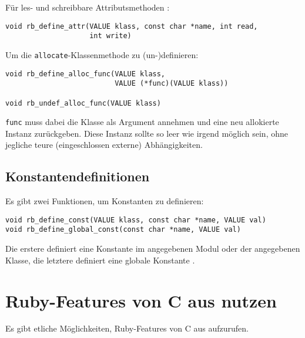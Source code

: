 Für les- und schreibbare Attributsmethoden :

\begin{lstlisting}
void rb_define_attr(VALUE klass, const char *name, int read,
                    int write)
\end{lstlisting}

Um die \verb+allocate+-Klassenmethode zu (un-)definieren:

\begin{lstlisting}
void rb_define_alloc_func(VALUE klass,
                          VALUE (*func)(VALUE klass))

void rb_undef_alloc_func(VALUE klass)
\end{lstlisting}

\noindent\verb+func+ muss dabei die Klasse als Argument annehmen und eine neu
allokierte Instanz zurückgeben. Diese Instanz sollte so leer wie
irgend möglich sein, ohne jegliche teure (eingeschlossen externe)
Abhängigkeiten.


\subsection{Konstantendefinitionen}
\label{sec:konst-def}

Es gibt zwei Funktionen, um Konstanten zu definieren: 

\begin{lstlisting}
void rb_define_const(VALUE klass, const char *name, VALUE val)
void rb_define_global_const(const char *name, VALUE val)
\end{lstlisting}

\noindent Die erstere definiert eine Konstante im angegebenen Modul oder der
angegebenen Klasse, die letztere definiert eine globale Konstante
.

\section{Ruby-Features von C aus nutzen}
\label{sec:ruby-von-c}

Es gibt etliche Möglichkeiten, Ruby-Features von C aus aufzurufen.

